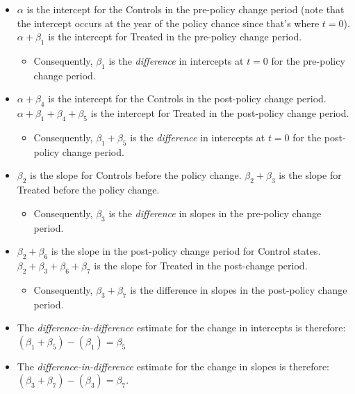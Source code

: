 \documentclass[12pt]{article}
\begin{document}
\begin{itemize}
  \item $\alpha$ is the intercept for the Controls in the pre-policy change period (note that the intercept occurs at the year of the policy chance since that's where $t=0$).
  $\alpha + \beta_{1}$ is the intercept for Treated in the pre-policy change period.
  \begin{itemize}
    \item Consequently, $\beta_1$ is the \emph{difference} in intercepts at $t=0$ for the pre-policy change period.
  \end{itemize}
  \item $\alpha + \beta_4$ is the intercept for the Controls in the post-policy change period. $\alpha + \beta_1 + \beta_4 + \beta_5$ is the intercept for Treated in the post-policy change period.
  \begin{itemize}
    \item Consequently, $\beta_1 + \beta_5$ is the \emph{difference} in intercepts at $t=0$ for the post-policy change period.
  \end{itemize}
  \item $\beta_2$ is the slope for Controls before the policy change. $\beta_2 + \beta_3$ is the slope for Treated before the policy change.
\begin{itemize}
  \item Consequently, $\beta_{3}$ is the \emph{difference} in slopes in the pre-policy change period.
\end{itemize}
  \item $\beta_{2} + \beta_{6}$ is the slope in the post-policy change period for Control states. $\beta_{2} + \beta_{3} + \beta_{6} + \beta_{7}$ is the slope for Treated in the post-change period.
  \begin{itemize}
    \item Consequently, $\beta_{3} + \beta_{7}$ is the difference in slopes in the post-policy change period.
  \end{itemize}
  \item The \emph{difference-in-difference} estimate for the change in intercepts is therefore: \\
   $(\beta_1 + \beta_5) - (\beta_1) = \beta_5$
  \item The \emph{difference-in-difference} estimate for the change in slopes is therefore:\\
   $(\beta_{3} + \beta_{7}) - (\beta_{3}) = \beta_7$.
\end{itemize}
\end{document}
